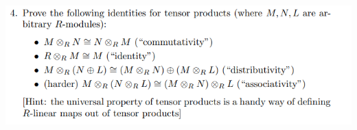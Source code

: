 \documentclass[12pt,letterpaper,boxed]{hmcpset}
\begin{document}


\begin{problem}[1]
	\hfill
\end{problem}

\begin{solution}
\end{solution}

\newpage


\begin{problem}[2]
	\hfill
\end{problem}

\begin{solution}
\end{solution}

\newpage


\begin{problem}[3]
	\hfill
\end{problem}
\begin{solution}
\end{solution}

\newpage


\begin{problem}
	\includegraphics[scale=0.8]{4.png}
	\hfill
\end{problem}
\end{document}
